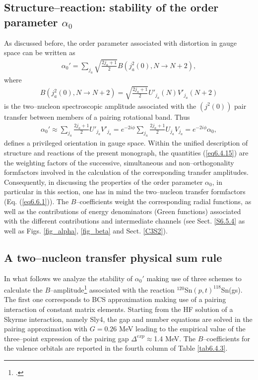 \subsection{Structure--reaction: stability of the order parameter $\alpha_0$}\label{C6S2.3}
As discussed before, the order parameter associated with distortion in gauge space can be written as 
\begin{align}
\alpha_0'=\sum_{j_a}\sqrt{\frac{2j_a+1}{2}}B(j^2_a(0),N\to N+2),
\end{align}
where
\begin{align}\label{eq6.4.15x}
B(j^2_a(0),N\to N+2)=\sqrt{\frac{2j_a+1}{2}}U'_{j_a}(N)V'_{j_a}(N+2)
\end{align}
is the two--nucleon spectroscopic amplitude associated with the $(j^2(0))$ pair transfer between members of a pairing rotational band. Thus 
\begin{align}\label{eq6.4.15}
\alpha_0'\approx\sum_{j_a}\frac{2j_a+1}{2}U'_{j_a}V'_{j_a}=e^{-2i\phi}\sum_{j_a}\frac{2j_a+1}{2}U_{j_a}V_{j_a}=e^{-2i\phi}\alpha_0,
\end{align}
defines a privileged orientation in gauge space. Within the unified description of structure and reactions of the present monograph, the quantities (\ref{eq6.4.15}) are the weighting factors of the successive, simultaneous and non--orthogonality formfactors involved in the calculation of the corresponding transfer amplitudes. Consequently, in discussing the properties of the order parameter $\alpha_0$, in particular in this section, one has in mind the two--nucleon transfer formfactors (Eq. (\ref{eq6.6.1})).  The $B$--coefficients weight the corresponding radial functions, as well as the contributions of energy denominators (Green functions) associated with the different contributions and intermediate channels (see Sect. \ref{S6.5.4} as well as Figs. \ref{fig_alpha}, \ref{fig_beta} and Sect. \ref{C3S2}). 

\subsection{A two--nucleon transfer physical sum rule}\label{S6.4.2}
 In what follows we analyze the stability of $\alpha_0'$ making use of three schemes to calculate the $B$--amplitude\footnote{\cite{Potel:17}.} associated with the reaction $^{120}$Sn$(p,t)^{118}$Sn(gs). The first one corresponds to BCS approximation making use of a pairing interaction of constant matrix elements.  Starting from the HF solution of a Skyrme interaction, namely Sly4, the gap and number equations are solved in the pairing approximation with $G=0.26$ MeV leading to the empirical value of the three--point expression of the pairing gap $\Delta^{exp}\approx$1.4 MeV. The $B$--coefficients for the valence orbitals are reported in the fourth column of Table \ref{tab6.4.3}. 


